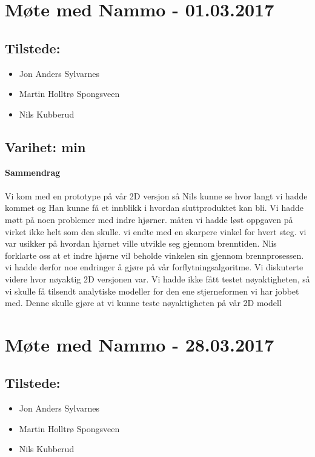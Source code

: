 \pagebreak

\section{Møte med Nammo - 01.03.2017}

\subsection*{Tilstede:}
\begin{multicols}{2}
\begin{itemize}
    \item Jon Anders Sylvarnes
    \item Martin Holltrø Spongsveen
    \item Nils Kubberud
\end{itemize}{}
\end{multicols}
\subsection*{\large Varihet:  min}
\textbf{\Large Sammendrag}\\ \\
Vi kom med en prototype på vår 2D versjon så Nils kunne se hvor langt vi hadde kommet og Han kunne få et innblikk i hvordan sluttproduktet kan bli. Vi hadde møtt på noen problemer med indre hjørner. måten vi hadde løst oppgaven på virket ikke helt som den skulle. vi endte med en skarpere vinkel for hvert steg. vi var usikker på hvordan hjørnet ville utvikle seg gjennom brenntiden. Nlis forklarte oss at et indre hjørne vil beholde vinkelen sin gjennom brennprosessen. vi hadde derfor noe endringer å gjøre på vår forflytningsalgoritme. Vi diskuterte videre hvor nøyaktig 2D versjonen var. Vi hadde ikke fått testet nøyaktigheten, så vi skulle få tilsendt analytiske modeller for den ene stjerneformen vi har jobbet med. Denne skulle gjøre at vi kunne teste nøyaktigheten på vår 2D modell  


\pagebreak

\section{Møte med Nammo - 28.03.2017}

\subsection*{Tilstede:}
\begin{multicols}{2}
\begin{itemize}
    \item Jon Anders Sylvarnes
    \item Martin Holltrø Spongsveen
    \item Nils Kubberud
\end{itemize}{}
\end{multicols}
